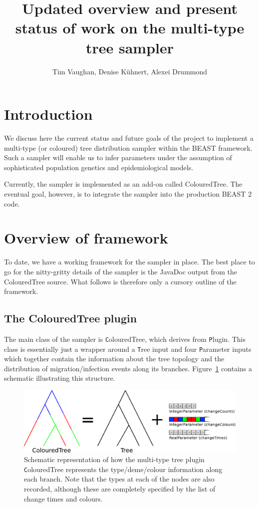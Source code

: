 \documentclass[a4paper,11pt]{article}
\newcommand{\class}[1]{{\texttt #1}}
\newcommand{\package}[1]{{\textsf #1}}
\begin{document}
\title{Updated overview and present status of work on the multi-type
  tree sampler}

\author{Tim Vaughan, Denise K\"uhnert, Alexei Drummond}

\maketitle

\section{Introduction}

We discuss here the current status and future goals of the project
to implement a multi-type (or coloured) tree distribution sampler
within the BEAST framework. Such a sampler will enable us to infer
parameters under the assumption of sophisticated population genetics
and epidemiological models.

Currently, the sampler is implemented as an add-on called
\package{ColouredTree}. The eventual goal, however, is to integrate the
sampler into the production BEAST 2 code.


\section{Overview of framework}

To date, we have a working framework for the sampler in place.  The
best place to go for the nitty-gritty details of the sampler is the
JavaDoc output from the ColouredTree source.  What follows is
therefore only a cursory outline of the framework.


\subsection{The ColouredTree plugin}

The main class of the sampler is \class{ColouredTree}, which derives
from \class{Plugin}. This class is essentially just a wrapper around a
\class{Tree} input and four \class{Parameter} inputs which together
contain the information about the tree topology and the distribution
of migration/infection events along its branches.
Figure~\ref{fig:treeComposition} contains a schematic illustrating
this structure.

\begin{figure}
\centering
\includegraphics[width=\textwidth]{treeComposition.pdf}
\caption{Schematic representation of how the multi-type tree plugin
  \class{ColouredTree} represents the type/deme/colour information
  along each branch.  Note that the types at each of the nodes are
  also recorded, although these are completely specified by the list
  of change times and colours.}
\label{fig:treeComposition}
\end{figure}
\end{document}
